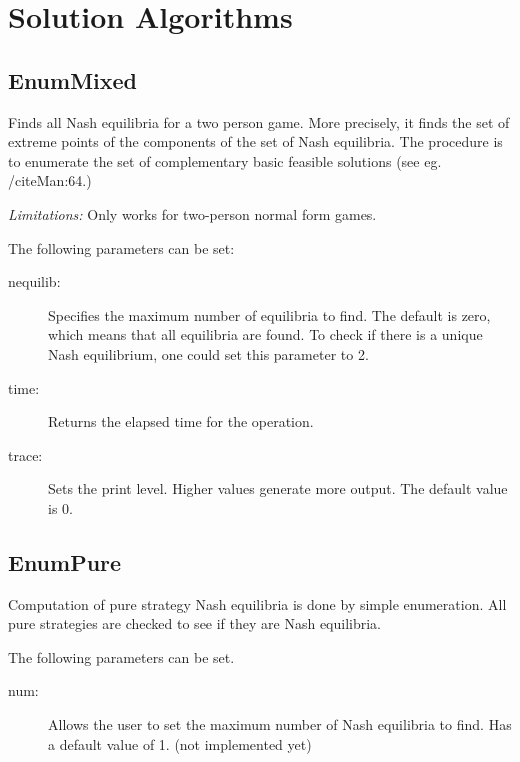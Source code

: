 \section{Solution Algorithms}\label{SolutionAlgorithms}

\subsection{EnumMixed}\label{EnumMixed}
Finds all Nash equilibria for a two person game.  More
precisely, it finds the set of extreme points of the components
of the set of Nash equilibria.  The procedure is to enumerate the set
of complementary basic feasible solutions (see eg. /cite{Man:64}.)

{\em Limitations:}  Only works for two-person normal form games. 

The following parameters can be set:

\begin{description}
\item[nequilib:] Specifies the maximum number of equilibria to find.  The
default is zero, which means that all equilibria are found.  To check if
there is a unique Nash equilibrium, one could set this parameter to 2.
\item[time:] Returns the elapsed time for the operation.
\item[trace:] Sets the print level.  Higher values generate more output.
The default value is 0.
\end{description}

\subsection{EnumPure}\label{EnumPure}
Computation of pure strategy Nash equilibria is done by simple enumeration.
All pure strategies are checked to see if they are Nash equilibria.  

The following parameters can be set. 

\begin{description}
\item[num:] Allows the user to set the maximum number of Nash equilibria to
find.  Has a default value of 1. (not implemented yet) 
\end{description}



